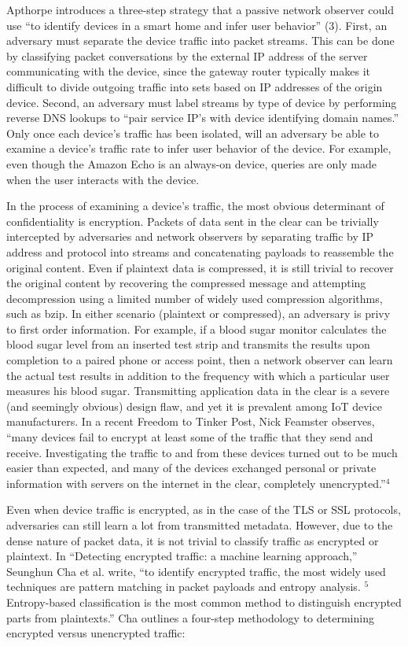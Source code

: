 Apthorpe introduces a three-step strategy that a passive network observer could use ``to identify devices in a smart home and infer user behavior'' (3). First, an adversary must separate the device traffic into packet streams. This can be done by classifying packet conversations by the external IP address of the server communicating with the device, since the gateway router typically makes it difficult to divide outgoing traffic into sets based on IP addresses of the origin device. Second, an adversary must label streams by type of device by performing reverse DNS lookups to ``pair service IP's with device identifying domain names.'' Only once each device's traffic has been isolated, will an adversary be able to examine a device's traffic rate to infer user behavior of the device. For example, even though the Amazon Echo is an always-on device, queries are only made when the user interacts with the device.

In the process of examining a device's traffic, the most obvious determinant of confidentiality is encryption. Packets of data sent in the clear can be trivially intercepted by adversaries and network observers by separating traffic by IP address and protocol into streams and concatenating payloads to reassemble the original content. Even if plaintext data is compressed, it is still trivial to recover the original content by recovering the compressed message and attempting decompression using a limited number of widely used compression algorithms, such as bzip. In either scenario (plaintext or compressed), an adversary is privy to first order information. For example, if a blood sugar monitor calculates the blood sugar level from an inserted test strip and transmits the results upon completion to a paired phone or access point, then a network observer can learn the actual test results in addition to the frequency with which a particular user measures his blood sugar. Transmitting application data in the clear is a severe (and seemingly obvious) design flaw, and yet it is prevalent among IoT device manufacturers. In a recent Freedom to Tinker Post, Nick Feamster observes, ``many devices fail to encrypt at least some of the traffic that they send and receive. Investigating the traffic to and from these devices turned out to be much easier than expected, and many of the devices exchanged personal or private information with servers on the internet in the clear, completely unencrypted.''$^4$

Even when device traffic is encrypted, as in the case of the TLS or SSL protocols, adversaries can still learn a lot from transmitted metadata. However, due to the dense nature of packet data, it is not trivial to classify traffic as encrypted or plaintext. In ``Detecting encrypted traffic: a machine learning approach,'' Seunghun Cha et al. write, ``to identify encrypted traffic, the most widely used techniques are pattern matching in packet payloads and entropy analysis. $^5$ Entropy-based classification is the most common method to distinguish encrypted parts from plaintexts.'' Cha outlines a four-step methodology to determining encrypted versus unencrypted traffic:


